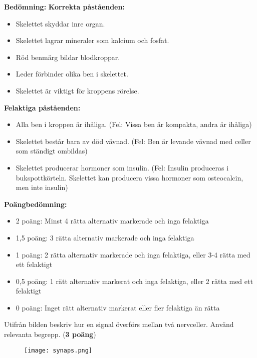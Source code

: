 \documentclass{exam}
\newenvironment{answer}
  {\begin{framed}\color{blue}\textbf{Bedömning:} }
  {\end{framed}}
\begin{document}
\begin{questions}
\begin{answer}
\textbf{Korrekta påståenden:}
\begin{itemize}
  \item Skelettet skyddar inre organ.
  \item Skelettet lagrar mineraler som kalcium och fosfat.
  \item Röd benmärg bildar blodkroppar.
  \item Leder förbinder olika ben i skelettet.
  \item Skelettet är viktigt för kroppens rörelse.
\end{itemize}

\textbf{Felaktiga påståenden:}
\begin{itemize}
  \item Alla ben i kroppen är ihåliga. (Fel: Vissa ben är kompakta, andra är ihåliga)
  \item Skelettet består bara av död vävnad. (Fel: Ben är levande vävnad med celler som ständigt ombildas)
  \item Skelettet producerar hormoner som insulin. (Fel: Insulin produceras i bukspottkörteln. Skelettet kan producera vissa hormoner som osteocalcin, men inte insulin)
\end{itemize}

\textbf{Poängbedömning:}
\begin{itemize}
  \item 2 poäng: Minst 4 rätta alternativ markerade och inga felaktiga
  \item 1,5 poäng: 3 rätta alternativ markerade och inga felaktiga
  \item 1 poäng: 2 rätta alternativ markerade och inga felaktiga, eller 3-4 rätta med ett felaktigt
  \item 0,5 poäng: 1 rätt alternativ markerat och inga felaktiga, eller 2 rätta med ett felaktigt
  \item 0 poäng: Inget rätt alternativ markerat eller fler felaktiga än rätta
\end{itemize}
\end{answer}
\break

\vspace{5mm} %
\begin{center}
\end{center}

\question
Utifrån bilden beskriv hur en signal överförs mellan två nervceller. Använd relevanta begrepp. (\textbf{3 poäng})
\begin{figure}[h]
\texttt{[image: synaps.png]}
\end{figure}
\vspace{10mm}


\end{questions}
\end{document}
